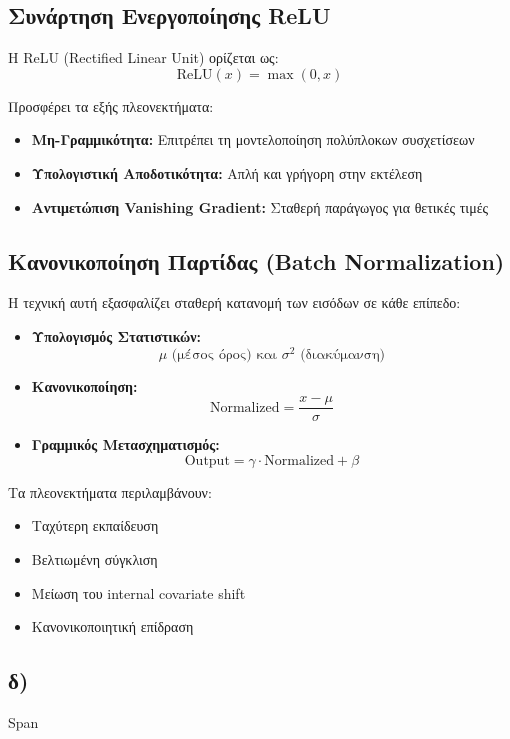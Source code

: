 \documentclass[a4paper,12pt]{article}
\begin{document}
\subsection*{Συνάρτηση Ενεργοποίησης ReLU}
Η ReLU (Rectified Linear Unit) ορίζεται ως:
\[ \text{ReLU}(x) = \max(0,x) \]

Προσφέρει τα εξής πλεονεκτήματα:
\begin{itemize}
   \item \textbf{Μη-Γραμμικότητα:} Επιτρέπει τη μοντελοποίηση πολύπλοκων συσχετίσεων
   \item \textbf{Υπολογιστική Αποδοτικότητα:} Απλή και γρήγορη στην εκτέλεση
   \item \textbf{Αντιμετώπιση Vanishing Gradient:} Σταθερή παράγωγος για θετικές τιμές
\end{itemize}

\subsection*{Κανονικοποίηση Παρτίδας (Batch Normalization)}
Η τεχνική αυτή εξασφαλίζει σταθερή κατανομή των εισόδων σε κάθε επίπεδο:

\begin{itemize}
   \item \textbf{Υπολογισμός Στατιστικών:}
   \[ \mu \text{ (μέσος όρος) και } \sigma^2 \text{ (διακύμανση)} \]
   
   \item \textbf{Κανονικοποίηση:}
   \[ \text{Normalized} = \frac{x - \mu}{\sigma} \]
   
   \item \textbf{Γραμμικός Μετασχηματισμός:}
   \[ \text{Output} = \gamma \cdot \text{Normalized} + \beta \]
\end{itemize}

Τα πλεονεκτήματα περιλαμβάνουν:
\begin{itemize}
   \item Ταχύτερη εκπαίδευση
   \item Βελτιωμένη σύγκλιση
   \item Μείωση του internal covariate shift
   \item Κανονικοποιητική επίδραση
\end{itemize}


\subsection*{δ)}

Span
\end{document}
